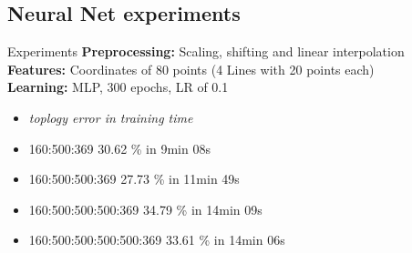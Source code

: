 \subsection{Neural Net experiments}
\begin{frame}{Experiments}
    \textbf{Preprocessing:} Scaling, shifting and linear interpolation\\
    \textbf{Features:} Coordinates of 80 points (4 Lines with 20 points each)\\
    \textbf{Learning:} MLP, 300 epochs, LR of 0.1
    \begin{itemize}
        \item[] \textit{toplogy       \tabto{6cm} error in training time}
        \item 160:500:369             \tabto{6cm} 30.62 \% in \hphantom{0}9min 08s
        \item 160:500:500:369         \tabto{6cm} 27.73 \% in 11min 49s
        \item 160:500:500:500:369     \tabto{6cm} 34.79 \% in 14min 09s
        \item 160:500:500:500:500:369 \tabto{6cm} 33.61 \% in 14min 06s
    \end{itemize}
\end{frame}